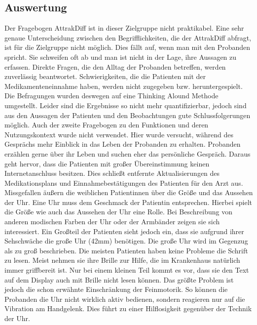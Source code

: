 \subsection{Auswertung}
Der Fragebogen AttrakDiff ist in dieser Zielgruppe nicht praktikabel. Eine sehr genaue Unterscheidung zwischen den Begrifflichkeiten, die der  AttrakDiff abfragt, ist für die Zielgruppe nicht möglich. Dies fällt auf, wenn man mit den Probanden spricht. Sie schweifen oft ab und man ist nicht in der Lage, ihre Aussagen zu erfassen. Direkte Fragen, die den Alltag der Probanden betreffen, werden zuverlässig beantwortet. Schwierigkeiten, die die Patienten mit der Medikamenteneinnahme haben,  werden nicht zugegeben bzw. heruntergespielt.
Die Befragungen wurden deswegen auf eine Thinking Alound Methode \cite{Sommerville:2016aa} umgestellt. Leider sind die Ergebnisse so nicht mehr quantifizierbar, jedoch sind aus den Aussagen der Patienten und den Beobachtungen gute Schlussfolgerungen möglich.
Auch der zweite Fragebogen zu den Funktionen und deren Nutzungskontext wurde nicht verwendet. Hier wurde versucht, während des Gesprächs  mehr Einblick in das Leben der Probanden zu erhalten. Probanden erzählen gerne über ihr Leben und suchen eher das persönliche Gespräch. Daraus geht hervor, dass die Patienten mit großer Übereinstimmung keinen Internetanschluss besitzen. Dies schließt entfernte Aktualisierungen des Medikationsplans und Einnahmebestätigungen des Patienten für den Arzt aus. Missgefallen äußern die weiblichen Patientinnen über die Größe und das Aussehen der Uhr. Eine Uhr muss dem Geschmack der Patientin entsprechen. Hierbei spielt die Größe wie auch das Aussehen der Uhr eine Rolle. Bei Beschreibung von anderen modischen Farben der Uhr oder der Armbänder zeigen sie sich interessiert. Ein Großteil der Patienten sieht jedoch ein, dass sie aufgrund ihrer Sehschwäche die große Uhr (42mm) benötigen. Die große Uhr wird im Gegenzug als zu groß beschrieben. Die meisten Patienten haben keine Probleme die Schrift zu lesen. Meist nehmen sie ihre Brille zur Hilfe, die im Krankenhaus natürlich immer griffbereit ist. Nur bei einem kleinen Teil kommt es vor, dass sie den Text auf dem Display auch mit Brille nicht lesen können. Das größte Problem ist jedoch die schon erwähnte Einschränkung der Feinmotorik. So können die Probanden die Uhr nicht wirklich aktiv bedienen, sondern reagieren nur auf die Vibration am Handgelenk. Dies führt zu einer Hilflosigkeit gegenüber der Technik der Uhr.
